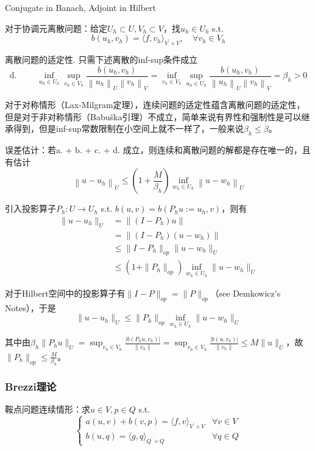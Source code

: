 Conjugate in Banach, Adjoint in Hilbert

对于协调元离散问题：给定$U_{h} \subset U, V_{h} \subset V$，找$u_{h} \in U_{h}$ s.t.
\[
  b(u_{h}, v_{h})=\langle f, v_h\rangle_{V^{\prime} \times V}, \quad \forall v_{h} \in V_{h}
\]

离散问题的适定性. 只需下述离散的inf-sup条件成立
\[
  \text{d. } \qquad \inf_{u_{h} \in U_{h}} \sup _{v_{h} \in V_{h}} \frac{b\left(u_{h}, v_{h}\right)}{\left\|u_{h}\right\|_{U}\left\|v_{h}\right\|_{V}}=\inf_{v_{h} \in V_{h}} \sup _{u_{h} \in U_{h}} \frac{b\left(u_{h}, v_{h}\right)}{\left\|u_{h}\right\|_{U}\left\|v_{h}\right\|_{V}}=\beta_{h}>0 
\]

对于对称情形（Lax-Milgram定理），连续问题的适定性蕴含离散问题的适定性，但是对于非对称情形（Babuška引理）不成立，简单来说有界性和强制性是可以继承得到，但是inf-sup常数限制在小空间上就不一样了，一般来说$\beta_h \le \beta$。

误差估计：若a. + b. + c. + d. 成立，则连续和离散问题的解都是存在唯一的，且有估计
\[
  \left\|u-u_{h}\right\|_{U} \le \left(1+\frac{M}{\beta_{h}}\right) \inf _{w_{h} \in U_{h}}\left\|u-w_{h}\right\|_{U}
\]

引入投影算子$P_h: U \to U_h$ s.t. $b(u, v) = b(P_h u:=u_h, v)$，则有
\[
  \begin{aligned}
    \|u - u_h\|_U &= \|(I - P_h)u\|\\
    &=\|(I - P_h)(u - w_h)\|\\
    &\le \|I - P_h\|_{op} \|u - w_h\|_U\\
    &\le (1 + \|P_h\|_{op}) \inf_{w_h \in U_h} \|u - w_h\|_U
  \end{aligned}
\]

对于Hilbert空间中的投影算子有$\|I - P\|_{op} = \|P\|_{op}$（see Demkowicz's Notes），于是
\[
  \|u - u_h\|_U \le \|P_h\|_{op} \inf_{w_h \in U_h} \|u - w_h\|_U
\]

其中由$\beta_h \|P_h u\|_U = \sup_{v_h \in V_h} \frac{|b(P_h u, v_h)|}{\|v_h\|}= \sup_{v_h \in V_h} \frac{|b(u, v_h)|}{\|v_h\|} \le M \|u\|_U$，故$\|P_h\|_{op} \le \frac{M}{\beta_h}$。

\subsubsection{Brezzi理论}

鞍点问题连续情形：求$u \in V, p \in Q$ s.t.
\[
  \left\{\begin{array}{ll}
    a(u, v)+b(v, p)=\langle f, v\rangle_{V^{\prime} \times V} & \forall v \in V \\
    b(u, q)=\langle g, q\rangle_{Q^{\prime} \times Q} & \forall q \in Q
  \end{array}\right.
\]


